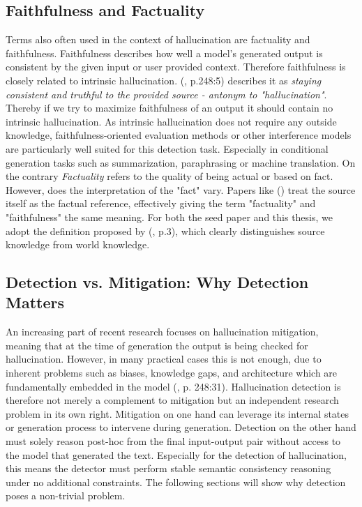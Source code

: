 \documentclass[
  seminar,   	 
  english,   	 
  titlepage=on,
  captions=tableheadings
]{ttlab-qualify}
\begin{document}
\subsection{Faithfulness and Factuality}
Terms also often used in the context of hallucination are factuality and faithfulness. Faithfulness describes how well a model's generated output is consistent by the given input or user provided context. Therefore faithfulness is closely related to intrinsic hallucination. (\cite{Ji2023HallucinationSurvey}, p.248:5) describes it as \textit{staying consistent and truthful to the provided source - antonym to "hallucination"}. Thereby if we try to maximize faithfulness of an output it should contain no intrinsic hallucination. As intrinsic hallucination does not require any outside knowledge, faithfulness-oriented evaluation methods or other interference models are particularly well suited for this detection task. Especially in conditional generation tasks such as summarization, paraphrasing or machine translation.
\newline
On the contrary \textit{Factuality} refers to the quality of being actual or based on fact. However, does the interpretation of the "fact" vary. Papers like (\cite{Dong2020MultiFactCorrection}) treat the source itself as the factual reference, effectively giving the term "factuality" and "faithfulness" the same meaning. For both the seed paper and this thesis, we adopt the definition proposed by (\cite{Maynez2020FaithfulnessFactuality}, p.3), which clearly distinguishes source knowledge from world knowledge.
\newline

\subsection{Detection vs. Mitigation: Why Detection Matters}
An increasing part of recent research focuses on hallucination mitigation, meaning that at the time of generation the output is being checked for hallucination. However, in many practical cases this is not enough, due to inherent problems such as biases, knowledge gaps, and architecture which are fundamentally embedded in the model (\cite{Ji2023HallucinationSurvey}, p. 248:31). Hallucination detection is therefore not merely a complement to mitigation but an independent research problem in its own right. Mitigation on one hand can leverage its internal states or generation process to intervene during generation.
Detection on the other hand must solely reason post-hoc from the final input-output pair without access to the model that generated the text.
Especially for the detection of hallucination, this means the detector must perform stable semantic consistency reasoning under no additional constraints. The following sections will show why detection poses a non-trivial problem.
\end{document}
